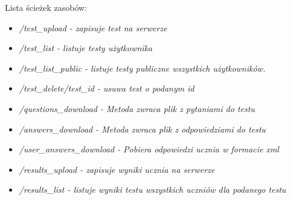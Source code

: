 \documentclass[letterpaper,10pt,polish]{manual}
\begin{document}
Lista ścieżek zasobów:
\begin{itemize}
\item {} 
\emph{/test\_upload - zapisuje test na serwerze}

\item {} 
\emph{/test\_list - listuje testy użytkownika}

\item {} 
\emph{/test\_list\_public - listuje testy publiczne wszystkich użytkowników.}

\item {} 
\emph{/test\_delete/test\_id - usuwa test o podanym id}

\item {} 
\emph{/questions\_download - Metoda zwraca plik z pytaniami do testu}

\item {} 
\emph{/answers\_download - Metoda zwraca plik z odpowiedziami do testu}

\item {} 
\emph{/user\_answers\_download - Pobiera odpowiedzi ucznia w formacie xml}

\item {} 
\emph{/results\_upload - zapisuje wyniki ucznia na serwerze}

\item {} 
\emph{/results\_list - listuje wyniki testu wszystkich uczniów dla podanego testu}

\end{itemize}
\end{document}
